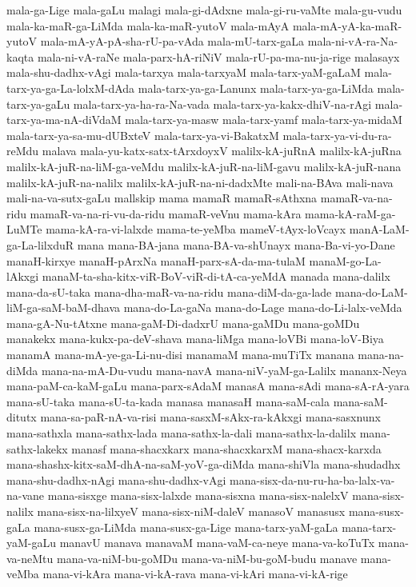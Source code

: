 {mala-ga-Lige
mala-gaLu
malagi
mala-gi-dAdxne
mala-gi-ru-vaMte
mala-gu-vudu
mala-ka-maR-ga-LiMda
mala-ka-maR-yutoV
mala-mAyA
mala-mA-yA-ka-maR-yutoV
mala-mA-yA-pA-sha-rU-pa-vAda
mala-mU-tarx-gaLa
mala-ni-vA-ra-Na-kaqta
mala-ni-vA-raNe
mala-parx-hA-riNiV
mala-rU-pa-ma-nu-ja-rige
malasayx
mala-shu-dadhx-vAgi
mala-tarxya
mala-tarxyaM
mala-tarx-yaM-gaLaM
mala-tarx-ya-ga-La-lolxM-dAda
mala-tarx-ya-ga-Lanunx
mala-tarx-ya-ga-LiMda
mala-tarx-ya-gaLu
mala-tarx-ya-ha-ra-Na-vada
mala-tarx-ya-kakx-dhiV-na-rAgi
mala-tarx-ya-ma-nA-diVdaM
mala-tarx-ya-masw
mala-tarx-yamf
mala-tarx-ya-midaM
mala-tarx-ya-sa-mu-dUBxteV
mala-tarx-ya-vi-BakatxM
mala-tarx-ya-vi-du-ra-reMdu
malava
mala-yu-katx-satx-tArxdoyxV
malilx-kA-juRnA
malilx-kA-juRna
malilx-kA-juR-na-liM-ga-veMdu
malilx-kA-juR-na-liM-gavu
malilx-kA-juR-nana
malilx-kA-juR-na-nalilx
malilx-kA-juR-na-ni-dadxMte
mali-na-BAva
mali-nava
mali-na-va-sutx-gaLu
mallskip
mama
mamaR
mamaR-sAthxna
mamaR-va-na-ridu
mamaR-va-na-ri-vu-da-ridu
mamaR-veVnu
mama-kAra
mama-kA-raM-ga-LuMTe
mama-kA-ra-vi-lalxde
mama-te-yeMba
mameV-tAyx-loVcayx
manA-LaM-ga-La-lilxduR
mana
mana-BA-jana
mana-BA-va-shUnayx
mana-Ba-vi-yo-Dane
manaH-kirxye
manaH-pArxNa
manaH-parx-sA-da-ma-tulaM
manaM-go-La-lAkxgi
manaM-ta-sha-kitx-viR-BoV-viR-di-tA-ca-yeMdA
manada
mana-dalilx
mana-da-sU-taka
mana-dha-maR-va-na-ridu
mana-diM-da-ga-lade
mana-do-LaM-liM-ga-saM-baM-dhava
mana-do-La-gaNa
mana-do-Lage
mana-do-Li-lalx-veMda
mana-gA-Nu-tAtxne
mana-gaM-Di-dadxrU
mana-gaMDu
mana-goMDu
manakekx
mana-kukx-pa-deV-shava
mana-liMga
mana-loVBi
mana-loV-Biya
manamA
mana-mA-ye-ga-Li-nu-disi
manamaM
mana-muTiTx
manana
mana-na-diMda
mana-na-mA-Du-vudu
mana-navA
mana-niV-yaM-ga-Lalilx
mananx-Neya
mana-paM-ca-kaM-gaLu
mana-parx-sAdaM
manasA
mana-sAdi
mana-sA-rA-yara
mana-sU-taka
mana-sU-ta-kada
manasa
manasaH
mana-saM-cala
mana-saM-ditutx
mana-sa-paR-nA-va-risi
mana-sasxM-sAkx-ra-kAkxgi
mana-sasxnunx
mana-sathxla
mana-sathx-lada
mana-sathx-la-dali
mana-sathx-la-dalilx
mana-sathx-lakekx
manasf
mana-shacxkarx
mana-shacxkarxM
mana-shacx-karxda
mana-shashx-kitx-saM-dhA-na-saM-yoV-ga-diMda
mana-shiVla
mana-shudadhx
mana-shu-dadhx-nAgi
mana-shu-dadhx-vAgi
mana-sisx-da-nu-ru-ha-ba-lalx-va-na-vane
mana-sisxge
mana-sisx-lalxde
mana-sisxna
mana-sisx-nalelxV
mana-sisx-nalilx
mana-sisx-na-lilxyeV
mana-sisx-niM-daleV
manasoV
manasusx
mana-susx-gaLa
mana-susx-ga-LiMda
mana-susx-ga-Lige
mana-tarx-yaM-gaLa
mana-tarx-yaM-gaLu
manavU
manava
manavaM
mana-vaM-ca-neye
mana-va-koTuTx
mana-va-neMtu
mana-va-niM-bu-goMDu
mana-va-niM-bu-goM-budu
manave
mana-veMba
mana-vi-kAra
mana-vi-kA-rava
mana-vi-kAri
mana-vi-kA-rige
}
